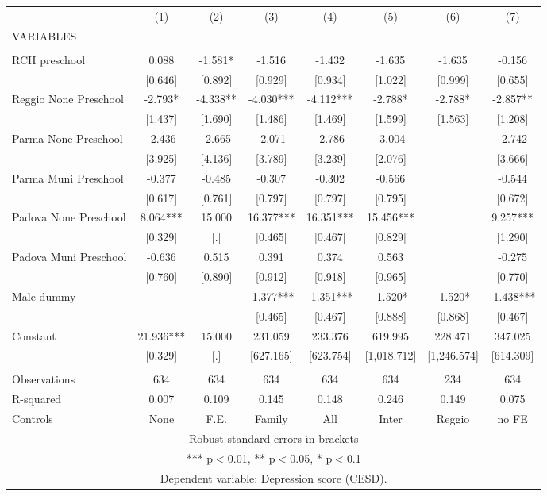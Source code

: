 \begin{tabular}{lccccccc} \hline
 & (1) & (2) & (3) & (4) & (5) & (6) & (7) \\
VARIABLES &  &  &  &  &  &  &  \\ \hline
 &  &  &  &  &  &  &  \\
RCH preschool & 0.088 & -1.581* & -1.516 & -1.432 & -1.635 & -1.635 & -0.156 \\
 & [0.646] & [0.892] & [0.929] & [0.934] & [1.022] & [0.999] & [0.655] \\
Reggio None Preschool & -2.793* & -4.338** & -4.030*** & -4.112*** & -2.788* & -2.788* & -2.857** \\
 & [1.437] & [1.690] & [1.486] & [1.469] & [1.599] & [1.563] & [1.208] \\
Parma None Preschool & -2.436 & -2.665 & -2.071 & -2.786 & -3.004 &  & -2.742 \\
 & [3.925] & [4.136] & [3.789] & [3.239] & [2.076] &  & [3.666] \\
Parma Muni Preschool & -0.377 & -0.485 & -0.307 & -0.302 & -0.566 &  & -0.544 \\
 & [0.617] & [0.761] & [0.797] & [0.797] & [0.795] &  & [0.672] \\
Padova None Preschool & 8.064*** & 15.000 & 16.377*** & 16.351*** & 15.456*** &  & 9.257*** \\
 & [0.329] & [.] & [0.465] & [0.467] & [0.829] &  & [1.290] \\
Padova Muni Preschool & -0.636 & 0.515 & 0.391 & 0.374 & 0.563 &  & -0.275 \\
 & [0.760] & [0.890] & [0.912] & [0.918] & [0.965] &  & [0.770] \\
Male dummy &  &  & -1.377*** & -1.351*** & -1.520* & -1.520* & -1.438*** \\
 &  &  & [0.465] & [0.467] & [0.888] & [0.868] & [0.467] \\
Constant & 21.936*** & 15.000 & 231.059 & 233.376 & 619.995 & 228.471 & 347.025 \\
 & [0.329] & [.] & [627.165] & [623.754] & [1,018.712] & [1,246.574] & [614.309] \\
 &  &  &  &  &  &  &  \\
Observations & 634 & 634 & 634 & 634 & 634 & 234 & 634 \\
R-squared & 0.007 & 0.109 & 0.145 & 0.148 & 0.246 & 0.149 & 0.075 \\
 Controls & None & F.E. & Family & All & Inter & Reggio & no FE \\ \hline
\multicolumn{8}{c}{ Robust standard errors in brackets} \\
\multicolumn{8}{c}{ *** p$<$0.01, ** p$<$0.05, * p$<$0.1} \\
\multicolumn{8}{c}{ Dependent variable: Depression score (CESD).} \\
\end{tabular}
